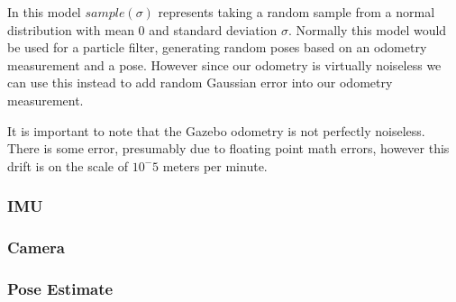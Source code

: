 \documentclass[thesis.tex]{subfile}
\begin{document}
In this model $sample(\sigma)$ represents taking a random sample from a normal distribution with mean 0 and standard deviation $\sigma$. Normally this model would be used for a particle filter, generating random poses based on an odometry measurement and a pose. However since our odometry is virtually noiseless we can use this instead to add random Gaussian error into our odometry measurement.

It is important to note that the Gazebo odometry is not perfectly noiseless. There is some error, presumably due to floating point math errors, however this drift is on the scale of $10^-5$ meters per minute. %

\subsubsection{IMU}
\subsubsection{Camera}
\subsubsection{Pose Estimate}
\end{document}
